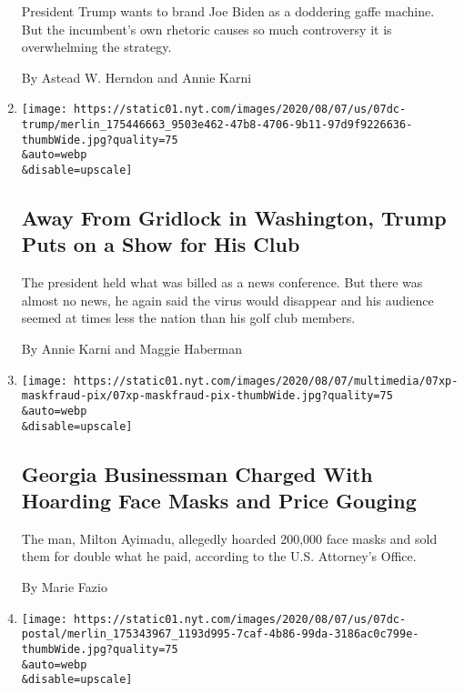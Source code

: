\begin{enumerate}
  President Trump wants to brand Joe Biden as a doddering gaffe machine.
  But the incumbent's own rhetoric causes so much controversy it is
  overwhelming the strategy.

  By Astead W. Herndon and Annie Karni
\item
  \href{/2020/08/07/us/politics/trump-news-conference-bedminster.html}{}

  \texttt{[image: https://static01.nyt.com/images/2020/08/07/us/07dc-trump/merlin\_175446663\_9503e462-47b8-4706-9b11-97d9f9226636-thumbWide.jpg?quality=75\\\&auto=webp\\\&disable=upscale]}

  \hypertarget{away-from-gridlock-in-washington-trump-puts-on-a-show-for-his-club}{%
  \subsection{Away From Gridlock in Washington, Trump Puts on a Show for
  His
  Club}\label{away-from-gridlock-in-washington-trump-puts-on-a-show-for-his-club}}

  The president held what was billed as a news conference. But there was
  almost no news, he again said the virus would disappear and his
  audience seemed at times less the nation than his golf club members.

  By Annie Karni and Maggie Haberman
\item
  \href{/2020/08/07/us/face-masks-baby-pupuu-coronavirus.html}{}

  \texttt{[image: https://static01.nyt.com/images/2020/08/07/multimedia/07xp-maskfraud-pix/07xp-maskfraud-pix-thumbWide.jpg?quality=75\\\&auto=webp\\\&disable=upscale]}

  \hypertarget{georgia-businessman-charged-with-hoarding-face-masks-and-price-gouging}{%
  \subsection{Georgia Businessman Charged With Hoarding Face Masks and
  Price
  Gouging}\label{georgia-businessman-charged-with-hoarding-face-masks-and-price-gouging}}

  The man, Milton Ayimadu, allegedly hoarded 200,000 face masks and sold
  them for double what he paid, according to the U.S. Attorney's Office.

  By Marie Fazio
\item
  \href{/2020/08/07/us/politics/postal-service-reorganization-mail-ballots.html}{}

  \texttt{[image: https://static01.nyt.com/images/2020/08/07/us/07dc-postal/merlin\_175343967\_1193d995-7caf-4b86-99da-3186ac0c799e-thumbWide.jpg?quality=75\\\&auto=webp\\\&disable=upscale]}


\end{enumerate}
